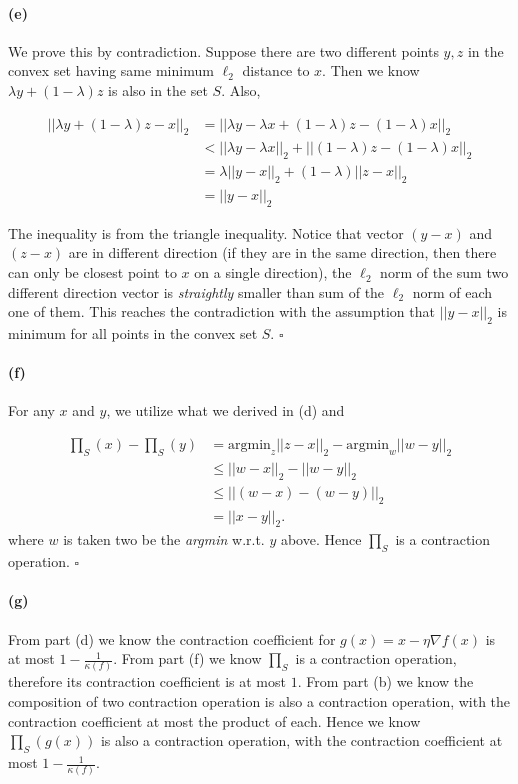 \documentclass[12pt]{article}
\begin{document}
\paragraph{(e)} We prove this by contradiction. Suppose there are two different points $y, z$ in the convex set having same minimum $\ell_2$ distance to $x$. Then we know $\lambda y + (1-\lambda)z$ is also in the set $S$. Also, 

\begin{align*}
||\lambda y + (1-\lambda)z - x||_2 & = ||\lambda y - \lambda x + (1-\lambda)z - (1-\lambda)x||_2 \\
&< ||\lambda y - \lambda x ||_2 + ||(1-\lambda)z - (1-\lambda)x||_2\\
&= \lambda || y-x||_2 + (1-\lambda) ||z-x||_2\\
&= ||y-x||_2
\end{align*}

The inequality is from the triangle inequality. Notice that vector $(y-x)$ and $(z-x)$ are in different direction (if they are in the same direction, then there can only be closest point to $x$ on a single direction), the $\ell_2$ norm of the sum two different direction vector is \emph{straightly} smaller than sum of the $\ell_2$ norm of each one of them. This reaches the contradiction with the assumption that $||y-x||_2$ is minimum for all points in the convex set $S$. $\square$

\paragraph{(f)} For any $x$ and $y$, we utilize what we derived in (d) and 

\begin{align*}
\text{$\prod$}_S(x) - \text{$\prod$}_S(y) &= \text{argmin}_z ||z-x||_2 - \text{argmin}_w ||w-y||_2 \\
&\leq ||w-x||_2 - ||w-y||_2\\
&\leq ||(w-x) - (w-y)||_2\\
&= ||x-y||_2.
\end{align*}
where $w$ is taken two be the \emph{argmin} w.r.t. $y$ above. Hence $\prod_S$ is a contraction operation. $\square$

\paragraph{(g)} From part (d) we know the contraction coefficient for $g(x) = x - \eta \nabla f(x)$ is at most $1-\frac{1}{\kappa(f)}$. From part (f) we know $\prod_S$ is a contraction operation, therefore its contraction coefficient is at most $1$. From part (b) we know the composition of two contraction operation is also a contraction operation, with the contraction coefficient at most the product of each. Hence we know $\prod_S(g(x))$ is also a contraction operation, with the contraction coefficient at most $1-\frac{1}{\kappa(f)}$.
\end{document}
